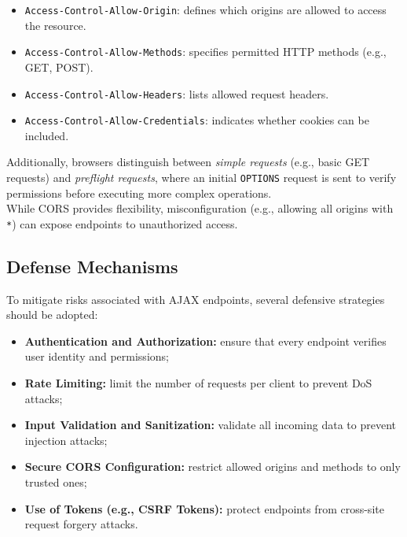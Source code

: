 \documentclass{scrbook}
\begin{document}
	\begin{itemize}
		\item \texttt{Access-Control-Allow-Origin}: defines which origins are allowed to access the resource.
		\item \texttt{Access-Control-Allow-Methods}: specifies permitted HTTP methods (e.g., GET, POST).
		\item \texttt{Access-Control-Allow-Headers}: lists allowed request headers.
		\item \texttt{Access-Control-Allow-Credentials}: indicates whether cookies can be included.
	\end{itemize}
	
	Additionally, browsers distinguish between \textit{simple requests} (e.g., basic GET requests) and \textit{preflight requests}, where an initial \texttt{OPTIONS} request is sent to verify permissions before executing more complex operations.\\
	
	While CORS provides flexibility, misconfiguration (e.g., allowing all origins with \texttt{*}) can expose endpoints to unauthorized access.
	
	\subsection{Defense Mechanisms}
	
	To mitigate risks associated with AJAX endpoints, several defensive strategies should be adopted:
	
	\begin{itemize}
		\item \textbf{Authentication and Authorization:} ensure that every endpoint verifies user identity and permissions;
		
		\item \textbf{Rate Limiting:} limit the number of requests per client to prevent DoS attacks;
		
		\item \textbf{Input Validation and Sanitization:} validate all incoming data to prevent injection attacks;
		
		\item \textbf{Secure CORS Configuration:} restrict allowed origins and methods to only trusted ones;
		
		\item \textbf{Use of Tokens (e.g., CSRF Tokens):} protect endpoints from cross-site request forgery attacks.
	\end{itemize}
	
\end{document}
